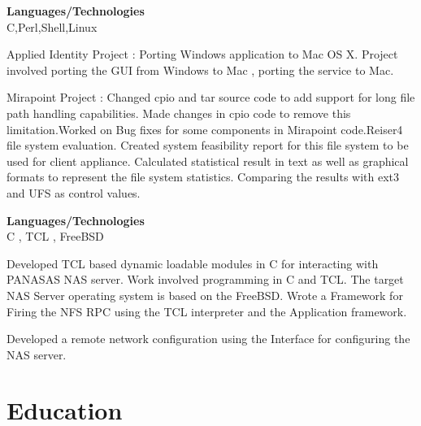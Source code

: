 \documentclass[a4,10pt]{cv4tw}
\begin{document}
{\textbf{Languages/Technologies} \\ C,Perl,Shell,Linux}
	{
	\begin{missions}
		\item Applied Identity Project : Porting Windows application to Mac OS X. Project involved porting the GUI from Windows to Mac , porting the service to Mac.
		\item Mirapoint Project : Changed cpio and tar source code to add support for long file path handling capabilities. Made changes in cpio code to remove this limitation.Worked on Bug fixes for some components in Mirapoint code.Reiser4 file system evaluation. Created system feasibility report for this file system to be used for client appliance. Calculated statistical result in text as well as graphical formats to represent the file system statistics. Comparing the results with ext3 and UFS as control values.
	\end{missions}
}

{\textbf{Languages/Technologies} \\ C , TCL , FreeBSD}
	{
	\begin{missions}
		\item Developed TCL based dynamic loadable modules in C for interacting with PANASAS NAS server. Work involved programming in C and TCL. The target NAS Server operating system is based on the FreeBSD. Wrote a Framework for Firing the NFS RPC using the TCL interpreter and the Application framework.
		\item Developed a remote network configuration using the  Interface for configuring the NAS server.
	\end{missions}
}


\section{Education}

\end{document}
